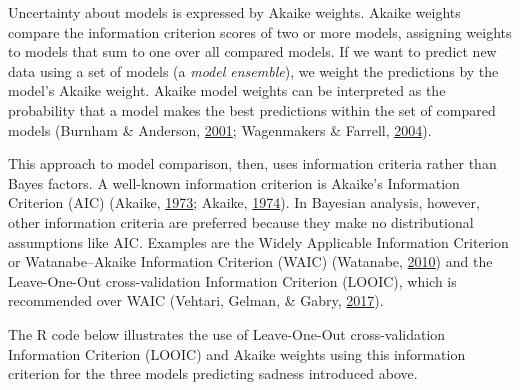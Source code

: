 \documentclass[doc]{apa6}
\begin{document}
Uncertainty about models is expressed by Akaike weights. Akaike weights
compare the information criterion scores of two or more models,
assigning weights to models that sum to one over all compared models. If
we want to predict new data using a set of models (a \emph{model
ensemble}), we weight the predictions by the model's Akaike weight.
Akaike model weights can be interpreted as the probability that a model
makes the best predictions within the set of compared models (Burnham \&
Anderson,
\protect\hyperlink{ref-BurnhamKullbackLeiblerinformationbasis2001}{2001};
Wagenmakers \& Farrell,
\protect\hyperlink{ref-WagenmakersAICmodelselection2004}{2004}).

This approach to model comparison, then, uses information criteria
rather than Bayes factors. A well-known information criterion is
Akaike's Information Criterion (AIC) (Akaike,
\protect\hyperlink{ref-AkaikeInformationtheoryextension1973}{1973};
Akaike,
\protect\hyperlink{ref-akaikeNewLookStatistical1974}{1974}). In Bayesian
analysis, however, other information criteria are preferred because they
make no distributional assumptions like AIC. Examples are the Widely
Applicable Information Criterion or Watanabe--Akaike Information
Criterion (WAIC) (Watanabe,
\protect\hyperlink{ref-WatanabeAsymptoticEquivalenceBayes2010}{2010})
and the Leave-One-Out cross-validation Information Criterion (LOOIC),
which is recommended over WAIC (Vehtari, Gelman, \& Gabry,
\protect\hyperlink{ref-Vehtari2017}{2017}).

The R code below illustrates the use of Leave-One-Out cross-validation
Information Criterion (LOOIC) and Akaike weights using this information
criterion for the three models predicting sadness introduced above.
\end{document}
